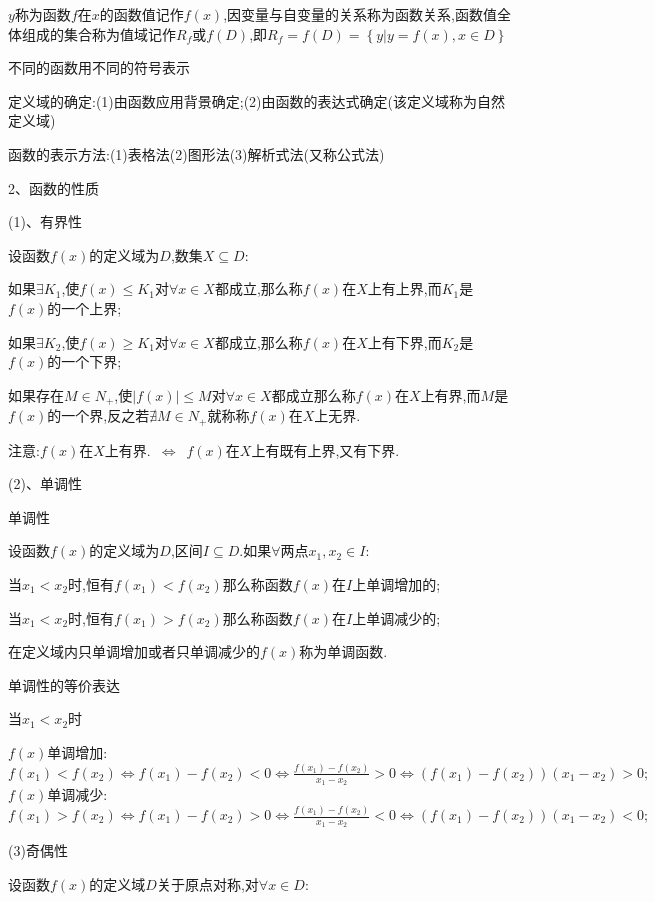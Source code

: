 \documentclass[utf8]{ctexart}
\begin{document}
$y$称为函数$f$在$x$的函数值记作$f(x)$,因变量与自变量的关系称为函数关系,函数值全体组成的集合称为值域记作$R_f$或$f(D)$,即$R_f=f(D)=\left\{  y|y=f(x),x\in D \right\}$

不同的函数用不同的符号表示

定义域的确定:(1)由函数应用背景确定;(2)由函数的表达式确定(该定义域称为自然定义域)

函数的表示方法:(1)表格法(2)图形法(3)解析式法(又称公式法)

2、函数的性质

(1)、有界性

设函数$f(x)$的定义域为$D$,数集$X\subseteq D$:

如果$\exists K_{1}$,使$f(x)\leqslant K_{1}$对$\forall x\in X$都成立,那么称$f(x)$在$X$上有上界,而$K_{1}$是$f(x)$的一个上界;

如果$\exists K_{2}$,使$f(x)\geqslant  K_{1}$对$\forall x\in X$都成立,那么称$f(x)$在$X$上有下界,而$K_{2}$是$f(x)$的一个下界;

如果存在$M\in N_{+}$,使$|f(x)|\leqslant M$对$\forall x\in X$都成立那么称$f(x)$在$X$上有界,而$M$是$f(x)$的一个界,反之若$\nexists M\in N_{+}$就称称$f(x)$在$X$上无界.

注意:$f(x)$在$X$上有界.\ $\Longleftrightarrow $\ $f(x)$在$X$上有既有上界,又有下界.

(2)、单调性

单调性

设函数$f(x)$的定义域为$D$,区间$I\subseteq D$.如果$\forall $两点$x_{1},x_{2}\in I$:

当$x_{1}<x_{2}$时,恒有$f(x_{1})<f(x_{2})$那么称函数$f(x)$在$I$上单调增加的;

当$x_{1}<x_{2}$时,恒有$f(x_{1})>f(x_{2})$那么称函数$f(x)$在$I$上单调减少的;

在定义域内只单调增加或者只单调减少的$f(x)$称为单调函数.

单调性的等价表达

当$x_{1}<x_{2}$时

$f(x)$单调增加:$f(x_{1})<f(x_{2})\Leftrightarrow f(x_{1})-f(x_{2})<0\Leftrightarrow\displaystyle\frac{f(x_{1})-f(x_{2})}{x_1-x_2}>0\Leftrightarrow (f(x_{1})-f(x_{2}))(x_{1}-x_{2})>0; $\\

$f(x)$单调减少:$f(x_{1})>f(x_{2})\Leftrightarrow f(x_{1})-f(x_{2})>0\Leftrightarrow\displaystyle\frac{f(x_{1})-f(x_{2})}{x_1-x_2}<0\Leftrightarrow (f(x_{1})-f(x_{2}))(x_{1}-x_{2})<0 ;$

(3)奇偶性

设函数$f(x)$的定义域$D$关于原点对称,对$\forall x\in D$:
\end{document}
